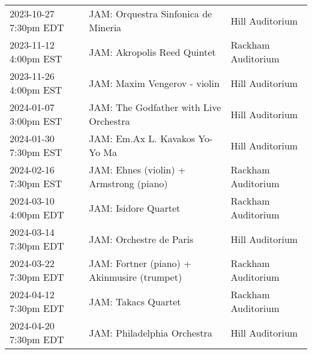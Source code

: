 \documentclass{article}
\begin{document}
\thispagestyle{empty}
\vspace{5in}
\begin{center}
  \begin{tabular}{l|l|l}
    2023-10-27 7:30pm EDT & JAM: Orquestra Sinfonica de Mineria & Hill Auditorium\\
    2023-11-12 4:00pm EST & JAM: Akropolis Reed Quintet & Rackham Auditorium\\
    2023-11-26 4:00pm EST & JAM: Maxim Vengerov - violin & Hill Auditorium\\
    2024-01-07 3:00pm EST & JAM: The Godfather with Live Orchestra & Hill Auditorium\\
    2024-01-30 7:30pm EST & JAM: Em.Ax L. Kavakos Yo-Yo Ma & Hill Auditorium\\
    2024-02-16 7:30pm EST & JAM: Ehnes (violin) + Armstrong (piano) & Rackham Auditorium\\
    2024-03-10 4:00pm EDT & JAM: Isidore Quartet & Rackham Auditorium\\
    2024-03-14 7:30pm EDT & JAM: Orchestre de Paris & Hill Auditorium\\
    2024-03-22 7:30pm EDT & JAM: Fortner (piano) + Akinmusire (trumpet) & Rackham Auditorium\\
    2024-04-12 7:30pm EDT & JAM: Takacs Quartet & Rackham Auditorium\\
    2024-04-20 7:30pm EDT & JAM: Philadelphia Orchestra & Hill Auditorium\\
  \end{tabular}
\end{center}
\end{document}
